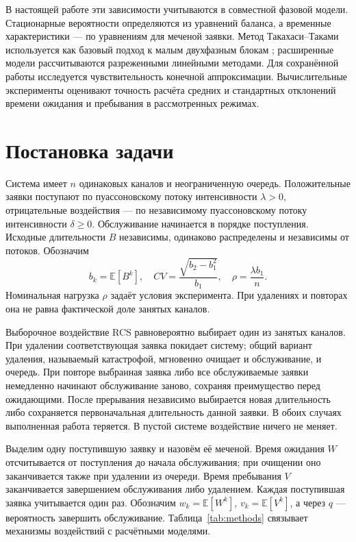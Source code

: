 \documentclass[a4paper,12pt]{article}
\begin{document}
В настоящей работе эти зависимости учитываются в совместной фазовой модели. Стационарные вероятности определяются из уравнений баланса, а временные характеристики --- по уравнениям для меченой заявки. Метод Такахаси--Таками используется как базовый подход к малым двухфазным блокам \cite{takahashi1976,ryzhikov2018ru}; расширенные модели рассчитываются разреженными линейными методами. Для сохранённой работы исследуется чувствительность конечной аппроксимации. Вычислительные эксперименты оценивают точность расчёта средних и стандартных отклонений времени ожидания и пребывания в рассмотренных режимах.

\section{Постановка задачи}
Система имеет \(n\) одинаковых каналов и неограниченную очередь. Положительные заявки поступают по пуассоновскому потоку интенсивности \(\lambda>0\), отрицательные воздействия --- по независимому пуассоновскому потоку интенсивности \(\delta\ge0\). Обслуживание начинается в порядке поступления. Исходные длительности \(B\) независимы, одинаково распределены и независимы от потоков. Обозначим
\[
b_k=\mathbb E[B^k],\quad CV=\frac{\sqrt{b_2-b_1^2}}{b_1},\quad \rho=\frac{\lambda b_1}{n}.
\]
Номинальная нагрузка \(\rho\) задаёт условия эксперимента. При удалениях и повторах она не равна фактической доле занятых каналов.

Выборочное воздействие RCS равновероятно выбирает один из занятых каналов. При удалении соответствующая заявка покидает систему; общий вариант удаления, называемый катастрофой, мгновенно очищает и обслуживание, и очередь. При повторе выбранная заявка либо все обслуживаемые заявки немедленно начинают обслуживание заново, сохраняя преимущество перед ожидающими. После прерывания независимо выбирается новая длительность либо сохраняется первоначальная длительность данной заявки. В обоих случаях выполненная работа теряется. В пустой системе воздействие ничего не меняет.

Выделим одну поступившую заявку и назовём её меченой. Время ожидания \(W\) отсчитывается от поступления до начала обслуживания; при очищении оно заканчивается также при удалении из очереди. Время пребывания \(V\) заканчивается завершением обслуживания либо удалением. Каждая поступившая заявка учитывается один раз. Обозначим \(w_k=\mathbb E[W^k]\), \(v_k=\mathbb E[V^k]\), а через \(q\) --- вероятность завершить обслуживание. Таблица~\ref{tab:methods} связывает механизмы воздействий с расчётными моделями.
\end{document}
